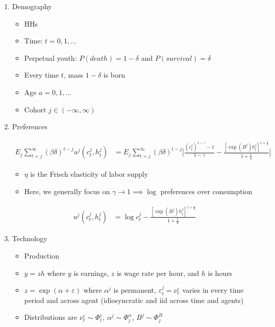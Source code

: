 \documentclass{article}
\begin{document}
\begin{enumerate}

\item Demography

\begin{itemize}
\item HHs
\item Time: $t=0,1,...$
\item Perpetual youth: $P(death) = 1 - \delta$ and $P(survival) = \delta$
\item Every time $t$, mass $1-\delta$ is born
\item Age $a = 0, 1,...$
\item Cohort $j \in (-\infty, \infty)$
\end{itemize}

\item Preferences

\begin{align*}
E_j \sum_{t=j}^\infty (\beta \delta)^{t-j} u^j(c_t^j, h_t^j) 
&= 
E_j \sum_{t=j}^\infty (\beta \delta)^{t-j} \Bigg[\frac{(c_t^j)^{1-\gamma}-1}{1-\gamma} - \frac{[\exp(B^j) h_t^j]^{1+\frac{1}{\eta}}}{1+\frac{1}{\eta}} \Bigg]
\end{align*}
\begin{itemize}
\item $\eta$ is the Frisch elasticity of labor supply
\item Here, we generally focus on $\gamma \to 1 \implies \log$ preferences over consumption
\end{itemize}
\begin{align*}
u^j(c_t^j, h_t^j) 
&= 
\log c_t^j - \frac{[\exp(B^j) h_t^j]^{1+\frac{1}{\eta}}}{1+\frac{1}{\eta}}
\end{align*}

\item Technology

\begin{itemize}
\item Production
\item $y = zh$ where $y$ is earnings, $z$ is wage rate per hour, and $h$ is hours
\item $z = \exp(\alpha + \varepsilon)$ where $\alpha^j$ is permanent, $\varepsilon_t^j = \nu_t^\varepsilon$ varies in every time period and across agent (idiosyncratic and iid across time and agents)
\item Distributions are $\nu_t^\varepsilon \sim \Phi_t^\varepsilon$, $\alpha^j \sim \Phi_j^\alpha$, $B^j \sim \Phi_j^B$ 
\end{itemize}


\end{enumerate}
\end{document}
